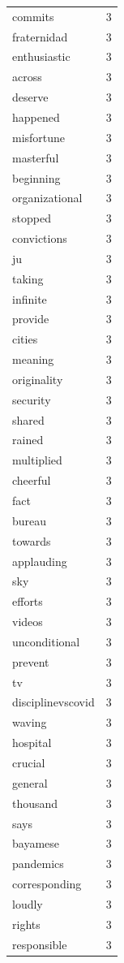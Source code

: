 \begin{tabular}{lr}
commits & 3 \\
fraternidad & 3 \\
enthusiastic & 3 \\
across & 3 \\
deserve & 3 \\
happened & 3 \\
misfortune & 3 \\
masterful & 3 \\
beginning & 3 \\
organizational & 3 \\
stopped & 3 \\
convictions & 3 \\
ju & 3 \\
taking & 3 \\
infinite & 3 \\
provide & 3 \\
cities & 3 \\
meaning & 3 \\
originality & 3 \\
security & 3 \\
shared & 3 \\
rained & 3 \\
multiplied & 3 \\
cheerful & 3 \\
fact & 3 \\
bureau & 3 \\
towards & 3 \\
applauding & 3 \\
sky & 3 \\
efforts & 3 \\
videos & 3 \\
unconditional & 3 \\
prevent & 3 \\
tv & 3 \\
disciplinevscovid & 3 \\
waving & 3 \\
hospital & 3 \\
crucial & 3 \\
general & 3 \\
thousand & 3 \\
says & 3 \\
bayamese & 3 \\
pandemics & 3 \\
corresponding & 3 \\
loudly & 3 \\
rights & 3 \\
responsible & 3 \\

\end{tabular}
